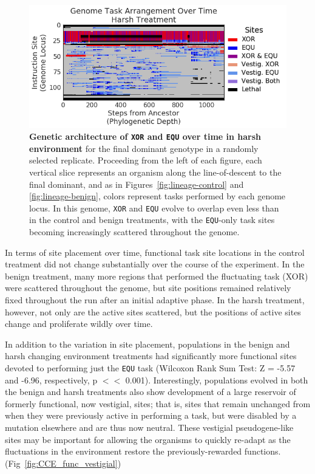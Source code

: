 \documentclass[10pt,letterpaper]{article}
\begin{document}
	\begin{figure}[!h]
	\includegraphics[width=0.75\columnwidth]{figures/CE/harsh__whole_taskmap.png}
	\caption{\textbf{Genetic architecture of \texttt{XOR} and \texttt{EQU} over time in harsh environment} for the final dominant genotype in a randomly selected replicate. Proceeding from the left of each figure, each vertical slice represents an organism along the line-of-descent to the final dominant, and as in Figures~\ref{fig:lineage-control} and \ref{fig:lineage-benign}, colors represent tasks performed by each genome locus. In this genome, \texttt{XOR} and \texttt{EQU} evolve to overlap even less than in the control and benign treatments, with the \texttt{EQU}-only task sites becoming increasingly scattered throughout the genome.}
	\label{fig:lineage-harsh}
	\end{figure}

In terms of site placement over time, functional task site locations in the control treatment did not change substantially over the course of the experiment. In the benign treatment, many more regions that performed the fluctuating task (XOR) were scattered throughout the genome, but site positions remained relatively fixed throughout the run after an initial adaptive phase. In the harsh treatment, however, not only are the active sites scattered, but the positions of active sites change and proliferate wildly over time.

In addition to the variation in site placement, populations in the benign and harsh changing environment treatments had significantly more functional sites devoted to performing just the \texttt{EQU} task (Wilcoxon Rank Sum Test: Z = -5.57 and -6.96, respectively, p $<<$ 0.001).
Interestingly, populations evolved in both the benign and harsh treatments also show development of a large reservoir of formerly functional, now vestigial, sites; that is, sites that remain unchanged from when they were previously active in performing a task, but were disabled by a mutation elsewhere and are thus now neutral. These vestigial pseudogene-like sites may be important for allowing the organisms to quickly re-adapt as the fluctuations in the environment restore the previously-rewarded functions. (Fig~\ref{fig:CCE_func_vestigial})
\end{document}
